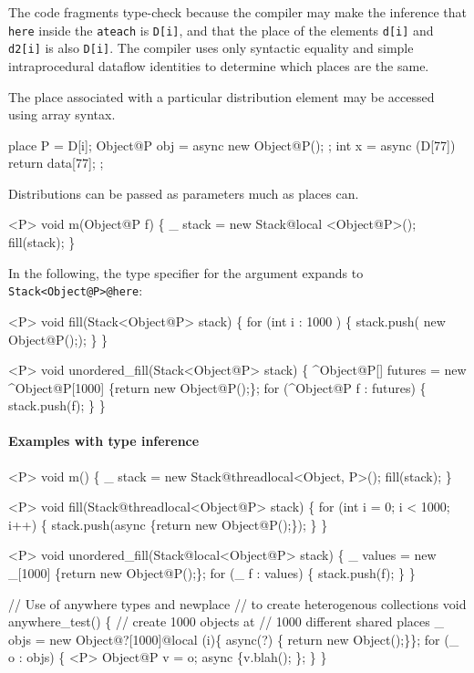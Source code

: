 The code fragments type-check because the compiler may make the
inference that {\tt here} inside the {\tt ateach} is {\tt D[i]}, and
that the place of the elements {\tt d[i]} and {\tt d2[i]} is also 
{\tt D[i]}. The \Xten{} compiler uses only syntactic equality and simple
intraprocedural dataflow identities to determine which places are the
same.  

The place associated with a particular distribution element may be
accessed using array syntax.
\begin{x10}
  place P = D[i];
  Object@P obj = async { new Object@P(); };
  int x = async (D[77]) { return data[77]; };
\end{x10}
Distributions can be passed as parameters much as places can.

\begin{x10}
 <P> void m(Object@P f) \{
    \_ stack = new Stack@local <Object@P>();
    fill(stack);
 \}
\end{x10}

In the following, the type specifier for the argument expands to
{\tt Stack<Object@P>@here}:

\begin{x10}
 <P> void fill(Stack<Object@P> stack) \{
    for (int i : 1000 ) \{
        stack.push( new Object@P(););
    \}
 \}

 <P> void unordered\_fill(Stack<Object@P> stack) \{
    ^Object@P[] futures = new ^Object@P[1000] 
          \{return new Object@P();\}; 
    for (^Object@P f : futures) \{
        stack.push(f);
    \}
 \}
\end{x10}

\paragraph{Examples with type inference}
\begin{x10}
 <P> void m() \{
    \_ stack = new Stack@threadlocal<Object, P>();
    fill(stack);
\}

 <P> void fill(Stack@threadlocal<Object@P> stack) \{
    for (int i = 0; i < 1000; i++) \{
        stack.push(async \{return new Object@P();\});
    \}
\}

<P> void unordered\_fill(Stack@local<Object@P> stack) \{
    \_ values = new \_[1000] \{return new Object@P();\};
    for (\_ f : values) \{
        stack.push(f);
    \}
\}

 // Use of anywhere types and newplace 
 // to create heterogenous collections
 void anywhere\_test() \{
    // create 1000 objects at 
    // 1000 different shared places
   \_ objs = new Object@?[1000]@local 
          (i)\{ async(?) \{ return new Object();\}\};
    for (\_ o : objs) \{
        <P> Object@P v = o;
        async \{v.blah(); \};
    \}
 \}
\end{x10}

